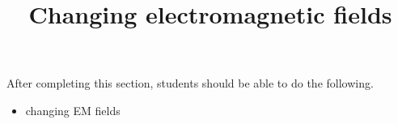 \documentclass{ximera}
\title{Changing electromagnetic fields}
\begin{document}
\begin{abstract}
\end{abstract}

\maketitle

\begin{sectionOutcomes}

After completing this section, students should be able to do the following.

\begin{itemize}
\item changing EM fields
\end{itemize}

\end{sectionOutcomes}
\end{document}
